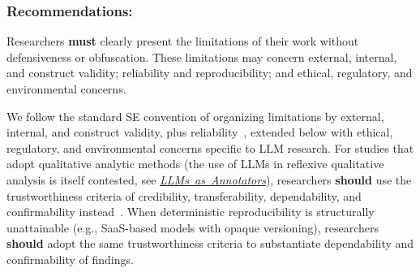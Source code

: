\documentclass[smallextended]{svjour3}
\newcommand{\must}{\textbf{must}\xspace}
\newcommand{\should}{\textbf{should}\xspace}
\newcommand{\annotators}{\hyperref[sec:llms-as-annotators]{\mbox{\emph{LLMs as Annotators}}}\xspace}
\newcommand{\annotators}{\href{/study-types/annotators/}{\emph{LLMs as Annotators}}\xspace}
\newcommand{\guidelinesubsubsection}[1]{\subsubsection{\bfseries #1:}}
\newcommand{\guidelinesubsubsection}[1]{\subsubsection{#1}}
\begin{document}
\guidelinesubsubsection{Recommendations}
Researchers \must clearly present the limitations of their work without defensiveness or obfuscation. These limitations may concern external, internal, and construct validity; reliability and reproducibility; and ethical, regulatory, and environmental concerns.

We follow the standard SE convention of organizing limitations by external, internal, and construct validity, plus reliability~\cite{DBLP:journals/ese/RunesonH09,ralph2021empiricalstandardssoftwareengineering}, extended below with ethical, regulatory, and environmental concerns specific to LLM research. For studies that adopt qualitative analytic methods (the use of LLMs in reflexive qualitative analysis is itself contested, see \annotators), researchers \should use the trustworthiness criteria of credibility, transferability, dependability, and confirmability instead~\cite{guba1981criteria}. When deterministic reproducibility is structurally unattainable (e.g., SaaS-based models with opaque versioning), researchers \should adopt the same trustworthiness criteria to substantiate dependability and confirmability of findings.
\end{document}
